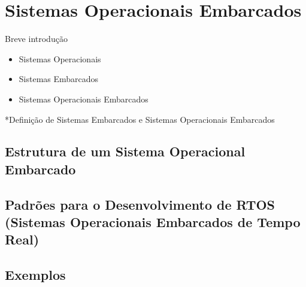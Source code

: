 \chapter{Sistemas Operacionais Embarcados}

Breve introdução

\begin{itemize}
	\item Sistemas Operacionais
	\item Sistemas Embarcados
	\item Sistemas Operacionais Embarcados
\end{itemize}


*Definição de Sistemas Embarcados e Sistemas Operacionais Embarcados

\section{Estrutura de um Sistema Operacional Embarcado}

\section{Padrões para o Desenvolvimento de RTOS (Sistemas Operacionais Embarcados de Tempo Real) }

\section{Exemplos}